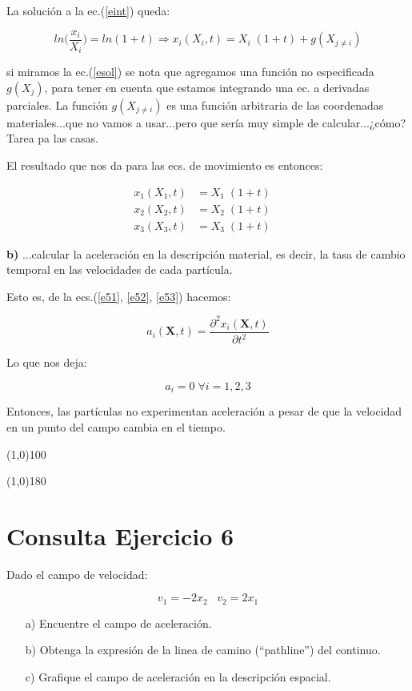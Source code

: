 \documentclass[10pt,a4paper]{article}
\begin{document}
La solución a la ec.(\ref{eint}) queda:

\begin{equation} \label{esol}
ln\Big( \dfrac{x_i}{X_i} \Big) = ln(1+t) \Rightarrow x_i(X_i, t)  = X_i \; (1+t) + g(X_{j \neq i})
\end{equation}

\noindent si miramos la ec.(\ref{esol}) se nota que agregamos una función no especificada $g(X_j)$, para tener en cuenta que estamos integrando una ec. a derivadas parciales. La función $g(X_{j\neq i})$ es una función arbitraria de las coordenadas materiales...que no vamos a usar...pero que sería muy simple de calcular...¿cómo? Tarea pa las casas.

El resultado que nos da para las ecs. de movimiento es entonces:

\begin{eqnarray}
\label{e51} x_1(X_1, t)  &= X_1 \; (1+t)& \\
\label{e52} x_2(X_2, t)  &= X_2 \; (1+t)& \\
\label{e53} x_3(X_3, t)  &= X_3 \; (1+t)& \
\end{eqnarray}


\textbf{b)} ...calcular la aceleración en la descripción material, es decir, la tasa de cambio temporal en las velocidades de cada partícula.

Esto es, de la ecs.(\ref{e51}, \ref{e52}, \ref{e53}) hacemos:

\begin{equation} \label{eacel}
a_i(\mathbf{X}, t) = \dfrac{\partial^2 x_i(\mathbf{X}, t)}{\partial t^2}
\end{equation}

Lo que nos deja:

\begin{equation}
a_i = 0 \; \forall i= 1,2,3
\end{equation}


Entonces, las partículas no experimentan aceleración a pesar de que la velocidad en un punto del campo cambia en el tiempo.

\line(1,0){100}

\line(1,0){180}


\section*{Consulta Ejercicio 6}
Dado el campo de velocidad:

\begin{equation}\label{ee6}
 v_1=-2x_2 \; \; \; v_2=2x_1
\end{equation}
\begin{itemize}
\item[a)] Encuentre el campo de aceleraci\'on.
\item[b)] Obtenga la expresi\'on de la linea de camino (``pathline'') del continuo. 
\item[c)] Grafique el campo de aceleración en la descripción espacial.
\end{itemize}
\end{document}

